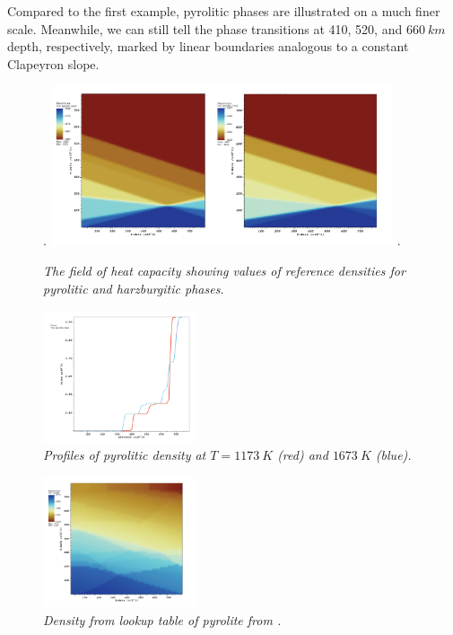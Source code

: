 \par Compared to the first example, pyrolitic phases are illustrated on a much finer scale.  %
Meanwhile, we can still tell the phase transitions at 410, 520, and $\SI{660}{km}$ depth, respectively, marked by linear boundaries analogous to a constant Clapeyron slope.


\begin{figure}
\phantom.
\hfill
\includegraphics[width=0.9\textwidth]{cookbooks/visualizing_phase_diagram/doc/pyrolite_harzburgite.png}
\hfill
\phantom.
\caption{\it The field of heat capacity showing values of reference densities for pyrolitic and harzburgitic phases.}
\label{fig:phase_diagram_ph_density}
\end{figure}

\begin{figure}
\centering
\includegraphics[width=0.4\textwidth]{cookbooks/visualizing_phase_diagram/doc/pyrolite_linear.png}
\caption{\it Profiles of pyrolitic density at $T=\SI{1173}{K}$ (red) and $\SI{1673}{K}$ (blue).}
\label{fig:phase_diagram_ph_profile}
\end{figure}
\begin{figure}
\centering
\includegraphics[width=0.4\textwidth]{cookbooks/visualizing_phase_diagram/doc/steinberg.png}
\caption{\it Density from lookup table of pyrolite from \cite{stixrude2011thermodynamics}.} %
\label{fig:phase_diagram_steinberg_density}
\end{figure}
